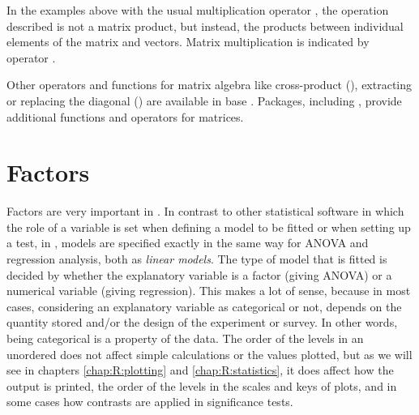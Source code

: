\documentclass[krantz2]{krantz}\usepackage{knitr}
\begin{document}
In the examples above with the usual multiplication operator \code{*}, the operation described is not a matrix product, but instead, the products between individual elements of the matrix and vectors. Matrix multiplication is indicated by operator \Roperator{\%*\%}.

\begin{knitrout}\footnotesize
{}\color{fgcolor}
\end{knitrout}

Other operators and functions for matrix algebra like cross-product (), extracting or replacing the diagonal () are available in base \Rlang. Packages, including , provide additional functions and operators for matrices.




\section{Factors}\label{sec:calc:factors}
Factors are very important in \Rlang. In contrast to other statistical software in which the role of a variable is set when defining a model to be fitted or when setting up a test, in \Rlang, models are specified exactly in the same way for ANOVA and regression analysis, both as \emph{linear models}. The type of model that is fitted is decided by whether the explanatory variable is a factor (giving ANOVA) or a numerical variable (giving regression). This makes a lot of sense, because in most cases, considering an explanatory variable as categorical or not, depends on the quantity stored and/or the design of the experiment or survey. In other words, being categorical is a property of the data. The order of the levels in an unordered  does not affect simple calculations or the values plotted, but as we will see in chapters \ref{chap:R:plotting} and \ref{chap:R:statistics}, it does affect how the output is printed, the order of the levels in the scales and keys of plots, and in some cases how contrasts are applied in significance tests.
\end{document}
